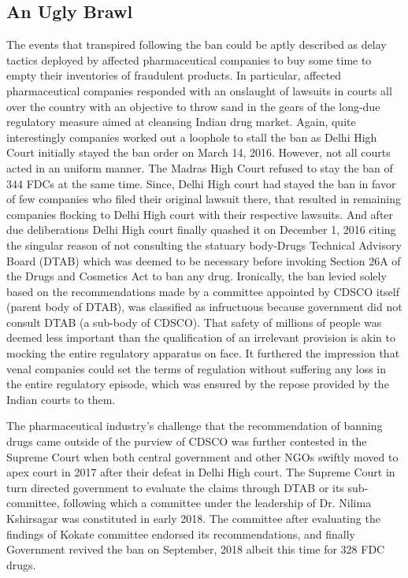 \documentclass[AER]{AEA}
\theoremstyle{theorem}
\begin{document}
\subsection*{An Ugly Brawl}

The events that transpired following the ban could be aptly described as delay tactics deployed by affected pharmaceutical companies to buy some time to empty their inventories of fraudulent products. In particular, affected pharmaceutical companies responded with an onslaught of lawsuits in courts all over the country with an objective to throw sand in the gears of the long-due regulatory measure aimed at cleansing Indian drug market. Again, quite interestingly companies worked out a loophole to stall the ban as Delhi High Court initially stayed the ban order  on March 14, 2016. However, not all courts acted in an uniform manner. The Madras High Court refused to stay the ban of 344 FDCs at the same time. Since, Delhi High court had stayed the ban  in favor of few companies who filed their original lawsuit there, that resulted in remaining companies flocking to Delhi High court with their respective lawsuits. And after due deliberations Delhi High court finally quashed it on December 1, 2016 citing the singular reason of not consulting the statuary body-Drugs Technical Advisory Board (DTAB) which was deemed to be necessary before invoking Section 26A of the Drugs and Cosmetics Act to ban any drug. Ironically, the ban levied solely based on the recommendations made by a committee appointed by CDSCO itself (parent body of DTAB), was classified as infructuous because government did not consult DTAB (a sub-body of CDSCO).
That safety of millions of people was deemed less important than the qualification of an irrelevant provision is akin to mocking the entire regulatory apparatus on face. It  furthered the impression that venal companies could set the terms of  regulation without suffering any loss in the entire regulatory episode, which was ensured by the repose provided by the Indian courts to them. 

The pharmaceutical industry's challenge that the recommendation of banning drugs came outside of the purview of CDSCO was further contested in the Supreme Court when both central government and other NGOs swiftly moved to apex court in 2017 after their defeat in Delhi High court. The Supreme Court in turn directed government to evaluate the claims through DTAB or its sub-committee, following which a committee under the leadership of Dr. Nilima Kshirsagar was constituted in early 2018. The committee after evaluating the findings of Kokate committee endorsed its recommendations, and finally Government revived the ban on September, 2018 albeit this time for 328 FDC drugs.
\end{document}
